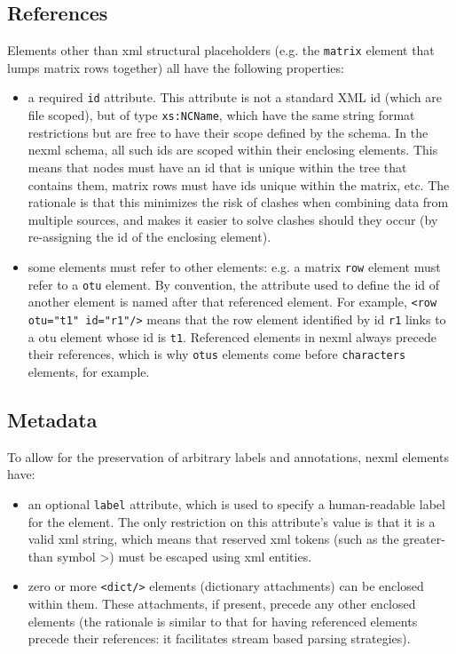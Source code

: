 \documentclass{article}
\newcommand{\code}{\texttt} \usepackage{fullpage}
\begin{document}
\subsection{References} Elements other than xml structural
placeholders (e.g. the \code{matrix} element that lumps matrix rows
together) all have the following properties: 
\begin{itemize} 
\item a required \code{id} attribute. This attribute is not a standard 
XML id (which are file scoped), but of type \code{xs:NCName}, which have 
the same string format restrictions but are free to have their scope defined
by the schema. In the nexml schema, all such ids are scoped within their
enclosing elements. This means that nodes must have an id that is unique
within the tree that contains them, matrix rows must have ids unique
within the matrix, etc. The rationale is that this minimizes the risk of
clashes when combining data from multiple sources, and makes it easier
to solve clashes should they occur (by re-assigning the id of the
enclosing element). 
\item some elements must refer to other elements: e.g. a matrix \code{row} 
element must refer to a \code{otu} element. By
convention, the attribute used to define the id of another element is
named after that referenced element. For example, \code{<row otu="t1"
id="r1"/>} means that the row element identified by id \code{r1} links
to a otu element whose id is \code{t1}. Referenced elements in nexml
always precede their references, which is why \code{otus} elements come
before \code{characters} elements, for example. 
\end{itemize}

\subsection{Metadata} 
To allow for the preservation of arbitrary labels and annotations, nexml 
elements have: 
\begin{itemize} 
\item an optional \code{label} attribute, which is used to specify a
human-readable label for the element. The only restriction on this
attribute's value is that it is a valid xml string, which means that
reserved xml tokens (such as the greater-than symbol >) must be escaped
using xml entities. 
\item zero or more \code{<dict/>} elements (dictionary attachments) can be 
enclosed within them. These attachments, if present, precede any other 
enclosed elements (the rationale is similar to that for having referenced 
elements precede their references: it facilitates stream based parsing 
strategies).
\end{itemize}
\end{document}

